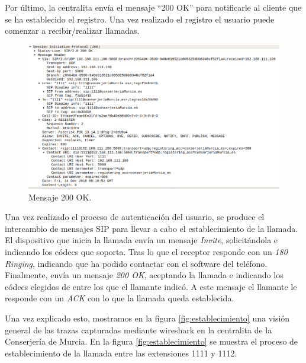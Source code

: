 \documentclass[a4paper]{article}
\begin{document}
\newpage
 Por último, la centralita envía el mensaje ``200 OK'' para notificarle al cliente que se ha establecido el registro. Una vez realizado el registro el usuario puede comenzar a recibir/realizar llamadas.

\begin{figure}[htb]
    \begin{center}
        \includegraphics[width=1\textwidth]{200OK.png}
         \caption{Mensaje 200 OK.}
         \label{fig:200}
    \end{center}
\end{figure}

 Una vez realizado el proceso de autenticación del usuario, se produce el intercambio de mensajes SIP para llevar a cabo el establecimiento de la llamada. El dispositivo que inicia la llamada envía un mensaje \textit{Invite}, solicitándola e indicando los códecs que soporta. Tras lo que el receptor responde con un \textit{180 Ringing}, indicando que ha podido contactar con el software del teléfono. Finalmente, envía un mensaje \textit{200 OK}, aceptando la llamada e indicando los códecs elegidos de entre los que el llamante indicó. A este mensaje el llamante le responde con un \textit{ACK} con lo que la llamada queda establecida. 

  Una vez explicado esto, mostramos en la figura \ref{fig:establecimiento} una visión general de las trazas capturadas mediante wireshark en la centralita de la Conserjería de Murcia. En la figura \ref{fig:establecimiento} se muestra el proceso de establecimiento de la llamada entre las extensiones 1111 y 1112.
\end{document}
